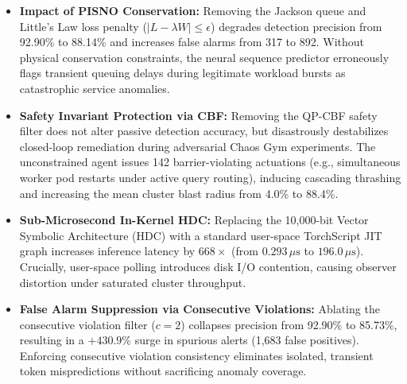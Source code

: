 \documentclass[letterpaper,twocolumn,10pt]{article}
\begin{document}
\begin{table}[t]
\centering
\footnotesize
\setlength{\tabcolsep}{2.2pt}
\caption{Ablation Study isolating PISNO, CBF, HDC, and Consecutive Violations components.}
\label{tab:ablation}
\end{table}

\begin{itemize}[leftmargin=*]
    \item \textbf{Impact of PISNO Conservation:} Removing the Jackson queue and Little's Law loss penalty ($|L - \lambda W| \le \epsilon$) degrades detection precision from 92.90\% to 88.14\% and increases false alarms from 317 to 892. Without physical conservation constraints, the neural sequence predictor erroneously flags transient queuing delays during legitimate workload bursts as catastrophic service anomalies.
    \item \textbf{Safety Invariant Protection via CBF:} Removing the QP-CBF safety filter does not alter passive detection accuracy, but disastrously destabilizes closed-loop remediation during adversarial Chaos Gym experiments. The unconstrained agent issues 142 barrier-violating actuations (e.g., simultaneous worker pod restarts under active query routing), inducing cascading thrashing and increasing the mean cluster blast radius from 4.0\% to 88.4\%.
    \item \textbf{Sub-Microsecond In-Kernel HDC:} Replacing the 10,000-bit Vector Symbolic Architecture (HDC) with a standard user-space TorchScript JIT graph increases inference latency by $668\times$ (from $0.293\,\mu\text{s}$ to $196.0\,\mu\text{s}$). Crucially, user-space polling introduces disk I/O contention, causing observer distortion under saturated cluster throughput.
    \item \textbf{False Alarm Suppression via Consecutive Violations:} Ablating the consecutive violation filter ($c=2$) collapses precision from 92.90\% to 85.73\%, resulting in a $+430.9\%$ surge in spurious alerts (1,683 false positives). Enforcing consecutive violation consistency eliminates isolated, transient token mispredictions without sacrificing anomaly coverage.
\end{itemize}
\end{document}
